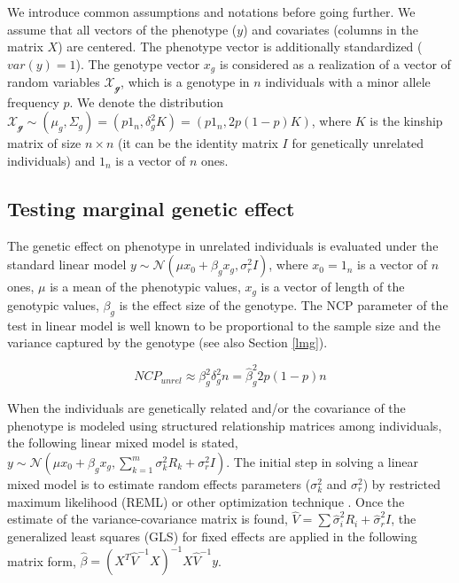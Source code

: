 \documentclass[]{book}
\begin{document}
We introduce common assumptions and notations before going further. We
assume that all vectors of the phenotype (\(y\)) and covariates (columns
in the matrix \(X\)) are centered. The phenotype vector is additionally
standardized (\(var(y) = 1\)). The genotype vector \(x_g\) is considered
as a realization of a vector of random variables \(\mathcal{X_g}\),
which is a genotype in \(n\) individuals with a minor allele frequency
\(p\). We denote the distribution
\(\mathcal{X_g} \sim (\mu_g, \Sigma_g) = (p 1_n, \delta_g^2 K) = (p 1_n, 2 p (1-p) K)\),
where \(K\) is the kinship matrix of size \(n \times n\) (it can be the
identity matrix \(I\) for genetically unrelated individuals) and \(1_n\)
is a vector of \(n\) ones.

\subsection{Testing marginal genetic
effect}\label{testing-marginal-genetic-effect}

The genetic effect on phenotype in unrelated individuals is evaluated
under the standard linear model
\(y \sim \mathcal{N} (\mu x_0 + \beta_g x_g, \sigma_r^2 I)\), where
\(x_0 = 1_n\) is a vector of \(n\) ones, \(\mu\) is a mean of the
phenotypic values, \(x_g\) is a vector of length of the genotypic
values, \(\beta_g\) is the effect size of the genotype. The NCP
parameter of the test in linear model is well known to be proportional
to the sample size and the variance captured by the genotype (see also
Section \ref{lmg}).

\begin{equation}
NCP_{unrel} \approx \beta_g^2 \delta_g^2 n  = \hat{\beta}_g^2 2 p (1 - p) n
\label{eq:ncpgun}
\end{equation}

When the individuals are genetically related and/or the covariance of
the phenotype is modeled using structured relationship matrices among
individuals, the following linear mixed model is stated,
\(y \sim \mathcal{N} (\mu x_0 + \beta_g x_g, \sum_{k=1}^{m}{\sigma_k^2 R_k} + \sigma_r^2 I)\).
The initial step in solving a linear mixed model is to estimate random
effects parameters (\(\sigma_k^2\) and \(\sigma_r^2\)) by restricted
maximum likelihood (REML) or other optimization technique
\citep{Lynch1998}. Once the estimate of the variance-covariance matrix
is found, \(\hat{V} = \sum{\hat{\sigma}_i^2 R_i} + \hat{\sigma}_r^2 I\),
the generalized least squares (GLS) for fixed effects are applied in the
following matrix form,
\(\hat{\beta} = \left(X^T \hat{V}^{-1} X\right)^{-1} X \hat{V}^{-1} y\).
\end{document}
